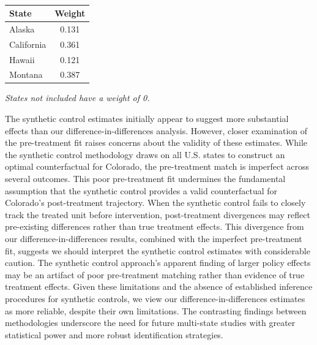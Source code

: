 \documentclass[12pt]{article}
\begin{document}
\begin{table}[htbp]
\centering

\caption{}
\label{tab:state_weights_synth}

\begin{tabular}{lc}
\hline
\textbf{State} & \textbf{Weight} \\
\hline
Alaska     & 0.131 \\
California & 0.361 \\
Hawaii     & 0.121 \\
Montana    & 0.387 \\
\hline
\end{tabular}

\vspace{0.4em}
{\small \textit{States not included have a weight of 0.}}

\end{table}


The synthetic control estimates initially appear to suggest more substantial effects than our difference-in-differences analysis. However, closer examination of the pre-treatment fit raises concerns about the validity of these estimates. While the synthetic control methodology draws on all U.S. states to construct an optimal counterfactual for Colorado, the pre-treatment match is imperfect across several outcomes. This poor pre-treatment fit undermines the fundamental assumption that the synthetic control provides a valid counterfactual for Colorado's post-treatment trajectory. When the synthetic control fails to closely track the treated unit before intervention, post-treatment divergences may reflect pre-existing differences rather than true treatment effects.
This divergence from our difference-in-differences results, combined with the imperfect pre-treatment fit, suggests we should interpret the synthetic control estimates with considerable caution. The synthetic control approach's apparent finding of larger policy effects may be an artifact of poor pre-treatment matching rather than evidence of true treatment effects. Given these limitations and the absence of established inference procedures for synthetic controls, we view our difference-in-differences estimates as more reliable, despite their own limitations. The contrasting findings between methodologies underscore the need for future multi-state studies with greater statistical power and more robust identification strategies.
\end{document}
